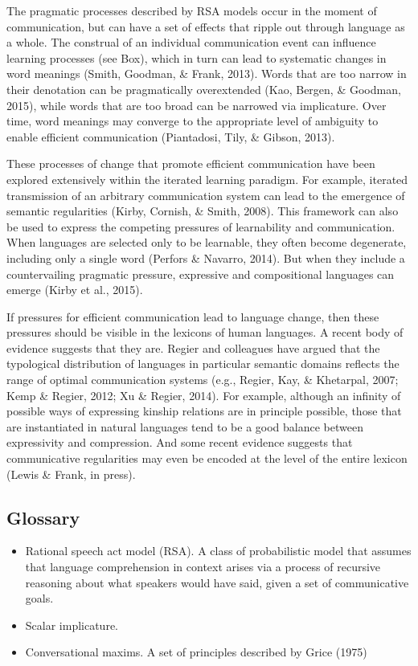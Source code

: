 \documentclass[]{elsarticle}
\begin{document}
The pragmatic processes described by RSA models occur in the moment of
communication, but can have a set of effects that ripple out through
language as a whole. The construal of an individual communication event
can influence learning processes (see Box), which in turn can lead to
systematic changes in word meanings (Smith, Goodman, \& Frank, 2013).
Words that are too narrow in their denotation can be pragmatically
overextended (Kao, Bergen, \& Goodman, 2015), while words that are too
broad can be narrowed via implicature. Over time, word meanings may
converge to the appropriate level of ambiguity to enable efficient
communication (Piantadosi, Tily, \& Gibson, 2013).

These processes of change that promote efficient communication have been
explored extensively within the iterated learning paradigm. For example,
iterated transmission of an arbitrary communication system can lead to
the emergence of semantic regularities (Kirby, Cornish, \& Smith, 2008).
This framework can also be used to express the competing pressures of
learnability and communication. When languages are selected only to be
learnable, they often become degenerate, including only a single word
(Perfors \& Navarro, 2014). But when they include a countervailing
pragmatic pressure, expressive and compositional languages can emerge
(Kirby et al., 2015).

If pressures for efficient communication lead to language change, then
these pressures should be visible in the lexicons of human languages. A
recent body of evidence suggests that they are. Regier and colleagues
have argued that the typological distribution of languages in particular
semantic domains reflects the range of optimal communication systems
(e.g., Regier, Kay, \& Khetarpal, 2007; Kemp \& Regier, 2012; Xu \&
Regier, 2014). For example, although an infinity of possible ways of
expressing kinship relations are in principle possible, those that are
instantiated in natural languages tend to be a good balance between
expressivity and compression. And some recent evidence suggests that
communicative regularities may even be encoded at the level of the
entire lexicon (Lewis \& Frank, in press).

\subsection{Glossary}\label{glossary}

\begin{itemize}
\item
  
  Rational speech act model (RSA). A class of probabilistic model that
  assumes that language comprehension in context arises via a process of
  recursive reasoning about what speakers would have said, given a set
  of communicative goals.
  
\item
  
  Scalar implicature.
  
\item
  
  Conversational maxims. A set of principles described by Grice (1975)
  
\end{itemize}
\end{document}
